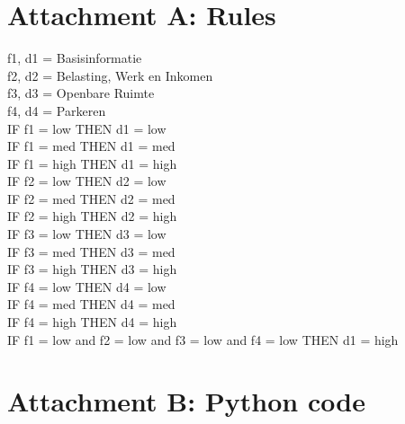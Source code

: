\documentclass[journal]{IEEEtran}
\begin{document}
\newpage

\section*{Attachment A: Rules}
\label{sec:rules}
\noindent
f1, d1 = Basisinformatie\\
f2, d2 = Belasting, Werk en Inkomen\\
f3, d3 = Openbare Ruimte\\
f4, d4 = Parkeren\\

\noindent
IF f1 = low THEN d1 = low\\
IF f1 = med THEN d1 = med\\
IF f1 = high THEN d1 = high\\
IF f2 = low THEN d2 = low\\
IF f2 = med THEN d2 = med\\
IF f2 = high THEN d2 = high\\
IF f3 = low THEN d3 = low\\
IF f3 = med THEN d3 = med\\
IF f3 = high THEN d3 = high\\
IF f4 = low THEN d4 = low\\
IF f4 = med THEN d4 = med\\
IF f4 = high THEN d4 = high\\
IF f1 = low and f2 = low and f3 = low and f4 = low THEN d1 = high

\newpage

\section*{Attachment B: Python code}
\label{sec:python}
\end{document}
